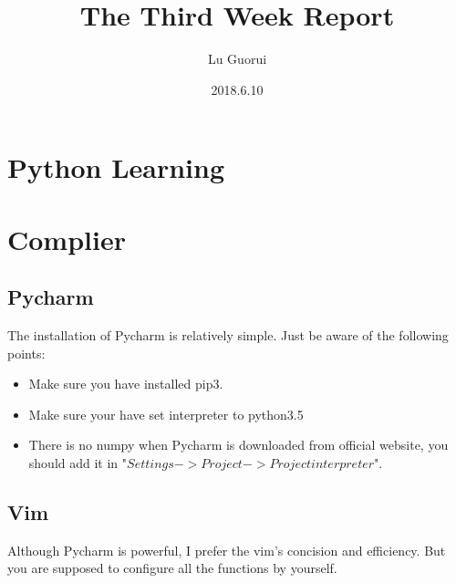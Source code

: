 \documentclass{article}
\title{The Third Week Report}
\author{Lu Guorui}
\date{2018.6.10}
\begin{document}
\maketitle
\tableofcontents

\newpage


\section*{Python Learning}

\section{Complier}
\subsection{Pycharm}
The installation of Pycharm is relatively simple. Just be aware of the following points:
\begin{itemize}
\item Make sure you have installed pip3.
\item Make sure your have set interpreter to python3.5
\item There is no numpy when Pycharm is downloaded from official website, you should add it in "$Settings -> Project -> Project interpreter$". 
\end{itemize}

\subsection{Vim}
Although Pycharm is powerful, I prefer the vim's concision and efficiency. But you are supposed to configure all the functions by yourself.
\end{document}
